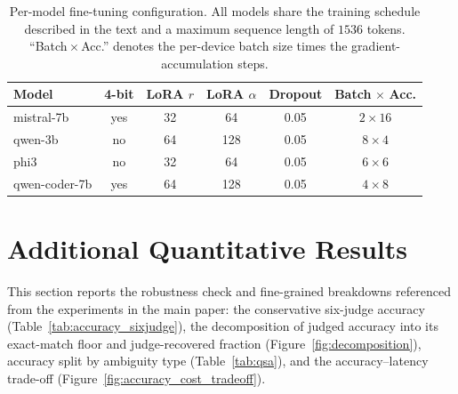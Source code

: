 \documentclass[letterpaper]{article}
\begin{document}
\begin{table}[h]
\centering
\small
\begin{tabular}{@{}lccccc@{}}
\toprule
\textbf{Model} & \textbf{4-bit} & \textbf{LoRA }$r$ & \textbf{LoRA }$\alpha$ & \textbf{Dropout} & \textbf{Batch}$\,\times\,$\textbf{Acc.} \\
\midrule
mistral-7b     & yes & 32 & 64  & 0.05 & $2\times16$ \\
qwen-3b        & no  & 64 & 128 & 0.05 & $8\times4$  \\
phi3           & no  & 32 & 64  & 0.05 & $6\times6$  \\
qwen-coder-7b  & yes & 64 & 128 & 0.05 & $4\times8$  \\
\bottomrule
\end{tabular}
\caption{Per-model fine-tuning configuration. All models share the training schedule described in the text and a maximum sequence length of $1536$ tokens. ``Batch\,$\times$\,Acc.'' denotes the per-device batch size times the gradient-accumulation steps.}
\label{tab:hparams}
\end{table}

\section{Additional Quantitative Results}
\label{app:results}

This section reports the robustness check and fine-grained breakdowns referenced from the experiments in the main paper: the conservative six-judge accuracy (Table~\ref{tab:accuracy_sixjudge}), the decomposition of judged accuracy into its exact-match floor and judge-recovered fraction (Figure~\ref{fig:decomposition}), accuracy split by ambiguity type (Table~\ref{tab:qsa}), and the accuracy--latency trade-off (Figure~\ref{fig:accuracy_cost_tradeoff}).
\end{document}

